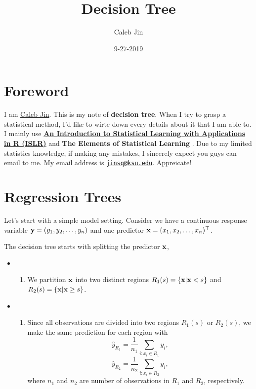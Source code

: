 \documentclass[]{book}
\title{Decision Tree}
\author{Caleb Jin}
\date{9-27-2019}
\providecommand{\tightlist}{%
  \setlength{\itemsep}{0pt}\setlength{\parskip}{0pt}}
\begin{document}
\maketitle

{
\setcounter{tocdepth}{1}
\tableofcontents
}
\hypertarget{Foreword}{%
\chapter*{Foreword}\label{Foreword}}

I am \href{https://www.sjin.name/}{Caleb Jin}. This is my note of \textbf{decision tree}. When I try to grasp a statistical method, I'd like to wirte down every details about it that I am able to. I mainly use \textbf{\href{http://faculty.marshall.usc.edu/gareth-james/ISL/}{An Introduction to Statistical Learning with Applications in R (ISLR)}} \citep{James2014} and \textbf{The Elements of Statistical Learning} \citep{hastie2008}. Due to my limited statistics knowledge, if making any mistakes, I sincerely expect you guys can email to me. My email address is \href{mailto:jinsq@ksu.edu}{\nolinkurl{jinsq@ksu.edu}}. Appreicate!

\newcommand\uy{{\bf y}}
\newcommand\uX{{\bf X}}
\newcommand\ux{{\bf x}}
\newcommand\T{{\top}}

\hypertarget{basic}{%
\chapter{Regression Trees}\label{basic}}

Let's start with a simple model setting. Consider we have a continuous response variable \({\bf y}=(y_1,y_2, \ldots, y_n)\) and one predictor \({\bf x}= (x_1, x_2, \ldots, x_n)^{{\top}}\).

The decision tree starts with splitting the predictor \({\bf x}\),

\begin{itemize}
\item
  \begin{enumerate}
  \def\labelenumi{\arabic{enumi})}
  \tightlist
  \item
    We partition \({\bf x}\) into two distinct regions \(R_1(s) = \{{\bf x}|{\bf x}<s\}\) and \(R_2(s) = \{{\bf x}|{\bf x}\geq s\}\).
  \end{enumerate}
\item
  \begin{enumerate}
  \def\labelenumi{\arabic{enumi})}
  \setcounter{enumi}{1}
  \tightlist
  \item
    Since all observations are divided into two regions \(R_1(s)\) or \(R_2(s)\), we make the same prediction for each region with \[
    \hat y_{R_1}=\frac{1}{n_1}\sum_{i:x_i\in R_1} y_i,\]
    \[\hat y_{R_2}=\frac{1}{n_2}\sum_{i: x_i\in R_2} y_i,\]
    where \(n_1\) and \(n_2\) are number of observations in \(R_1\) and \(R_2\), respectively.
  \end{enumerate}
\end{itemize}
\end{document}
